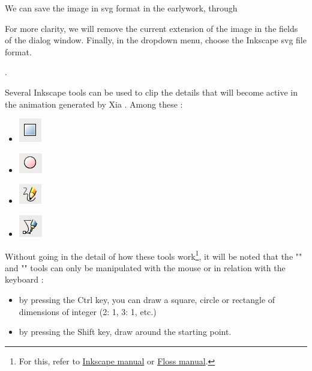 We can save the image in svg format in the earlywork, 
through 


For more clarity, we will remove the current extension of the image 
in the fields  of the dialog window. Finally, in the 
dropdown menu, choose the Inkscape svg file format. 

.

Several Inkscape tools can be used to clip the details that
will become active in the animation generated by Xia . Among these :
\begin{itemize}
 \item \includegraphics[scale=0.5]{./images/rec_carre} 
 \item \includegraphics[scale=0.5]{./images/cercles} 
 \item \includegraphics[scale=0.5]{./images/lignes} 
 \item \includegraphics[scale=0.5]{./images/bezier} 
\end{itemize}

Without going in the detail of how these tools work\footnote{For this, 
refer to \href{http://inkscape.org/doc/shapes/tutorial-shapes.fr.html}{Inkscape manual} or \href{http://en.flossmanuals.net/inkscape/}{Floss manual}.}, 
it will be noted that the "" and ""  tools can only be manipulated with the mouse or 
in relation with the keyboard :
\begin{itemize}
  \item by pressing the Ctrl key, you can draw a square, 
circle or rectangle of dimensions of integer (2: 1, 3: 1, etc.)
  \item by pressing the Shift key, draw around the starting point.
\end{itemize}

